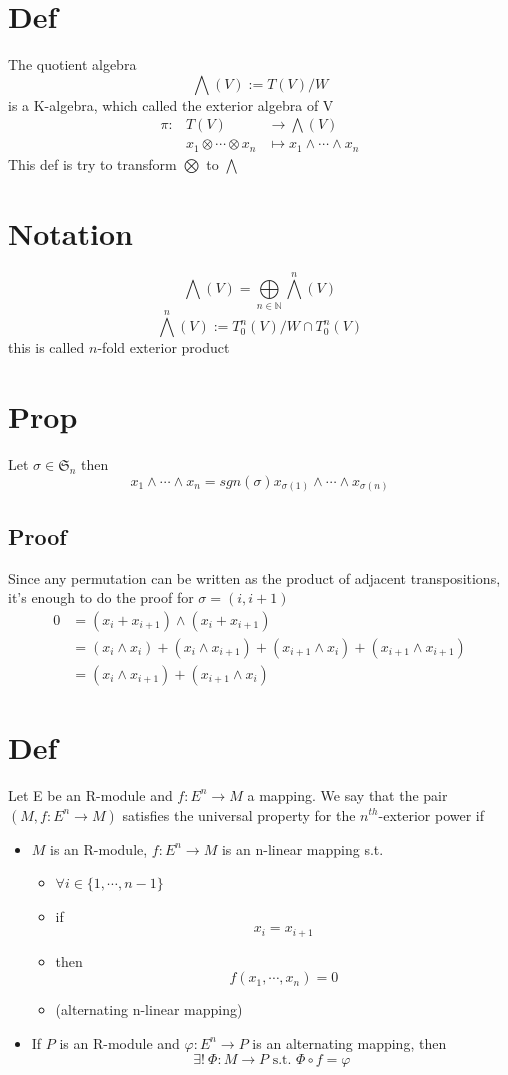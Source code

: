 \documentclass{book}
\begin{document}
\section{Def}
The quotient algebra $$\bigwedge(V):=T(V)/W$$
is a K-algebra, which called the exterior algebra of V
$$
\begin{aligned}
    \pi: &T(V) &\rightarrow \bigwedge(V)\\
    &x_1\otimes\cdots\otimes x_n &\mapsto x_1\wedge\cdots\wedge x_n
\end{aligned}$$
This def is try to transform $\bigotimes$ to $\bigwedge$
\section{Notation}
$$\bigwedge(V)=\bigoplus \limits_{n\in\mathbb{N}} \bigwedge^n(V)$$
$$\bigwedge^n(V):=T^n_0(V)/W\cap T_0^n(V)$$
this is called $n$-fold exterior product
\section{Prop}
Let $\sigma\in \mathfrak{S}_n$ then $$x_1\wedge\cdots\wedge x_n=sgn(\sigma) x_{\sigma(1)}\wedge\cdots\wedge x_{\sigma(n)}$$
\subsection*{Proof}
Since any permutation can be written as the product of adjacent transpositions, it's enough to do the proof for $\sigma=(i,i+1)$
$$
\begin{aligned}
    0 &=(x_i+x_{i+1})\wedge(x_i+x_{i+1})\\
    &=(x_i\wedge x_i)+(x_i\wedge x_{i+1})+(x_{i+1}\wedge x_i)+(x_{i+1}\wedge x_{i+1})\\
    &=(x_i\wedge x_{i+1})+(x_{i+1}\wedge x_i)
\end{aligned}
$$
\section{Def}
Let E be an R-module and $f:E^n\rightarrow M$ a mapping.
We say that the pair $(M,f:E^n\rightarrow M)$ satisfies the universal property for the $n^{th}$-exterior power if
\begin{itemize}
    \item $M$ is an R-module, $f:E^n\rightarrow M$ is an n-linear mapping s.t.
    \begin{itemize}
        \item[ ] $\forall i\in \{1,\cdots,n-1\}$
        \item[] if$$x_i=x_{i+1}$$
        \item[] then$$f(x_1,\cdots,x_n)=0$$
        \item[] (alternating n-linear mapping)
    \end{itemize}
    \item If $P$ is an R-module and $\varphi:E^n\rightarrow P$ is an alternating mapping, then 
    $$\exists !\ \Phi:M\rightarrow P\text{ s.t. }\Phi\circ f=\varphi$$
\end{itemize}
\end{document}
